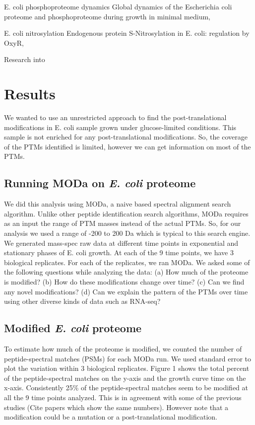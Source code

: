 \documentclass[12pt]{article}
\begin{document}
E. coli phosphoproteome dynamics \cite{Soaresetal2013}
{Global dynamics of the Escherichia coli proteome and phosphoproteome during growth in minimal medium},

E. coli nitrosylation \cite{Sethetal2012}
{Endogenous protein S-Nitrosylation in E. coli: regulation by OxyR},


Research into 

\section{Results}

We wanted to use an unrestricted approach to find the post-translational modifications in E. coli sample grown under glucose-limited conditions. This sample is not enriched for any post-translational modifications. So, the coverage of the PTMs identified is limited, however we can get information on most of the PTMs.
 
\subsection{Running MODa on \emph{E. coli} proteome}
We did this analysis using MODa, a naive based spectral alignment search algorithm. Unlike other peptide identification search algorithms, MODa requires as an input the range of PTM masses instead of the actual PTMs. So, for our analysis we used a range of -200 to 200 Da which is typical to this search engine. We generated mass-spec raw data at different time points in exponential and stationary phases of E. coli growth.
At each of the 9 time points, we have 3 biological replicates. For each of the replicates, we ran MODa. We asked some of the following questions while analyzing the data:
(a) How much of the proteome is modified? (b) How do these modifications change over time? (c) Can we find any novel modifications? (d) Can we explain the pattern of the PTMs over time using other diverse kinds of data such as RNA-seq?

\subsection{Modified \emph{E. coli} proteome}
To estimate how much of the proteome is modified, we counted the number of peptide-spectral matches (PSMs) for each MODa run. We used standard error to plot the variation within 3 biological replicates.
Figure 1 shows the total percent of the peptide-spectral matches on the y-axis and the growth curve time on the x-axis. Consistently 25\% of the peptide-spectral matches seem to be modified at all the 9 time points analyzed.
This is in agreement with some of the previous studies (Cite papers which show the same numbers). However note that a modification could be a mutation or a post-translational modification.
\end{document}
